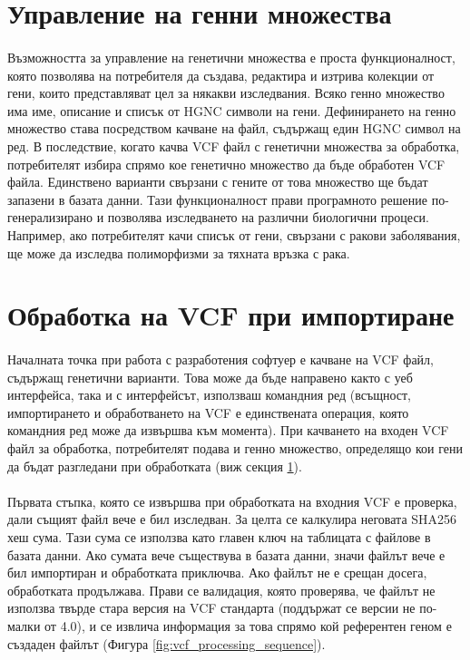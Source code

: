 \documentclass[pdftex,cyrillic,14pt,a4page,twoside,openright]{extreport}
\begin{document}
\section{Управление на генни множества}\label{sec:gene_sets}
\paragraph{}
Възможността за управление на генетични множества е проста функционалност, която позволява на потребителя да създава, редактира и изтрива колекции от гени, които представляват цел за някакви изследвания. Всяко генно множество има име, описание и списък от HGNC символи на гени. Дефинирането на генно множество става посредством качване на файл, съдържащ един HGNC символ на ред. В последствие, когато качва VCF файл с генетични множества за обработка, потребителят избира спрямо кое генетично множество да бъде обработен VCF файла. Единствено варианти свързани с гените от това множество ще бъдат запазени в базата данни. Тази функционалност прави програмното решение по-генерализирано и позволява изследването на различни биологични процеси. Например, ако потребителят качи списък от гени, свързани с ракови заболявания, ще може да изследва полиморфизми за тяхната връзка с рака.

\section{Обработка на VCF при импортиране}
\paragraph{}
Началната точка при работа с разработения софтуер е качване на VCF файл, съдържащ генетични варианти. Това може да бъде направено както с уеб интерфейса, така и с интерфейсът, използваш командния ред (всъщност, импортирането и обработването на VCF е единствената операция, която командния ред може да извършва към момента). При качването на входен VCF файл за обработка, потребителят подава и генно множество, определящо кои гени да бъдат разгледани при обработката (виж секция \ref{sec:gene_sets}).

\paragraph{}
Първата стъпка, която се извършва при обработката на входния VCF е проверка, дали същият файл вече е бил изследван. За целта се калкулира неговата SHA256 хеш сума. Тази сума се използва като главен ключ на таблицата с файлове в базата данни. Ако сумата вече съществува в базата данни, значи файлът вече е бил импортиран и обработката приключва. Ако файлът не е срещан досега, обработката продължава. Прави се валидация, която проверява, че файлът не използва твърде стара версия на VCF стандарта (поддържат се версии не по-малки от 4.0), и се извлича информация за това спрямо кой референтен геном е създаден файлът (Фигура \ref{fig:vcf_processing_sequence}).
\end{document}
